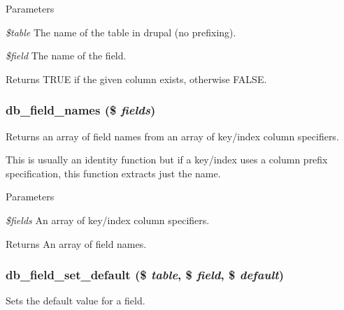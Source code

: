 \begin{DoxyParams}{Parameters}
\item[{\em \$table}]The name of the table in drupal (no prefixing). \item[{\em \$field}]The name of the field.\end{DoxyParams}
\begin{DoxyReturn}{Returns}
TRUE if the given column exists, otherwise FALSE. 
\end{DoxyReturn}
\hypertarget{group__schemaapi_gaeb423ba53e5133548abe3d999f86e787}{
\subsubsection[{db\_\-field\_\-names}]{\setlength{\rightskip}{0pt plus 5cm}db\_\-field\_\-names (\$ {\em fields})}}
\label{group__schemaapi_gaeb423ba53e5133548abe3d999f86e787}
Returns an array of field names from an array of key/index column specifiers.

This is usually an identity function but if a key/index uses a column prefix specification, this function extracts just the name.


\begin{DoxyParams}{Parameters}
\item[{\em \$fields}]An array of key/index column specifiers.\end{DoxyParams}
\begin{DoxyReturn}{Returns}
An array of field names. 
\end{DoxyReturn}
\hypertarget{group__schemaapi_ga63a499297d184dba68309dcd1b7e17d4}{
\subsubsection[{db\_\-field\_\-set\_\-default}]{\setlength{\rightskip}{0pt plus 5cm}db\_\-field\_\-set\_\-default (\$ {\em table}, \/  \$ {\em field}, \/  \$ {\em default})}}
\label{group__schemaapi_ga63a499297d184dba68309dcd1b7e17d4}
Sets the default value for a field.


